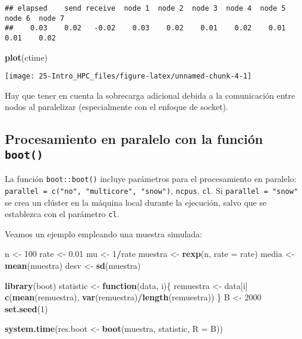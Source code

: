 \documentclass[
]{book}
\newenvironment{Shaded}{\begin{snugshade}}{\end{snugshade}}
\newcommand{\ControlFlowTok}[1]{\textcolor[rgb]{0.13,0.29,0.53}{\textbf{#1}}}
\newcommand{\DataTypeTok}[1]{\textcolor[rgb]{0.13,0.29,0.53}{#1}}
\newcommand{\DecValTok}[1]{\textcolor[rgb]{0.00,0.00,0.81}{#1}}
\newcommand{\FloatTok}[1]{\textcolor[rgb]{0.00,0.00,0.81}{#1}}
\newcommand{\KeywordTok}[1]{\textcolor[rgb]{0.13,0.29,0.53}{\textbf{#1}}}
\newcommand{\NormalTok}[1]{#1}
\newcommand{\OperatorTok}[1]{\textcolor[rgb]{0.81,0.36,0.00}{\textbf{#1}}}
\newcommand{\StringTok}[1]{\textcolor[rgb]{0.31,0.60,0.02}{#1}}
\theoremstyle{definition}
\theoremstyle{definition}
\theoremstyle{definition}
\theoremstyle{remark}
\begin{document}
\begin{verbatim}
## elapsed    send receive  node 1  node 2  node 3  node 4  node 5  node 6  node 7 
##    0.03    0.02   -0.02    0.03    0.02    0.01    0.02    0.01    0.01    0.02
\end{verbatim}

\begin{Shaded}
\begin{Highlighting}[]
\KeywordTok{plot}\NormalTok{(ctime)}
\end{Highlighting}
\end{Shaded}

\begin{center}\texttt{[image: 25-Intro\_HPC\_files/figure-latex/unnamed-chunk-4-1]} \end{center}

Hay que tener en cuenta la sobrecarga adicional debida a la comunicación entre nodos
al paralelizar (especialmente con el enfoque de socket).

\hypertarget{procesamiento-en-paralelo-con-la-funciuxf3n-boot}{%
\subsection{\texorpdfstring{Procesamiento en paralelo con la función \texttt{boot()}}{Procesamiento en paralelo con la función boot()}}\label{procesamiento-en-paralelo-con-la-funciuxf3n-boot}}

La función \texttt{boot::boot()} incluye parámetros para el procesamiento en paralelo:
\texttt{parallel\ =\ c("no",\ "multicore",\ "snow")}, \texttt{ncpus}, \texttt{cl}.
Si \texttt{parallel\ =\ "snow"} se crea un clúster en la máquina local durante la ejecución,
salvo que se establezca con el parámetro \texttt{cl}.

Veamos un ejemplo empleando una muestra simulada:

\begin{Shaded}
\begin{Highlighting}[]
\NormalTok{n <-}\StringTok{ }\DecValTok{100}
\NormalTok{rate <-}\StringTok{ }\FloatTok{0.01}
\NormalTok{mu <-}\StringTok{ }\DecValTok{1}\OperatorTok{/}\NormalTok{rate}
\NormalTok{muestra <-}\StringTok{ }\KeywordTok{rexp}\NormalTok{(n, }\DataTypeTok{rate =}\NormalTok{ rate)}
\NormalTok{media <-}\StringTok{ }\KeywordTok{mean}\NormalTok{(muestra)}
\NormalTok{desv <-}\StringTok{ }\KeywordTok{sd}\NormalTok{(muestra)}

\KeywordTok{library}\NormalTok{(boot)}
\NormalTok{statistic <-}\StringTok{ }\ControlFlowTok{function}\NormalTok{(data, i)\{}
\NormalTok{  remuestra <-}\StringTok{ }\NormalTok{data[i]}
  \KeywordTok{c}\NormalTok{(}\KeywordTok{mean}\NormalTok{(remuestra), }\KeywordTok{var}\NormalTok{(remuestra)}\OperatorTok{/}\KeywordTok{length}\NormalTok{(remuestra))}
\NormalTok{\}}
\NormalTok{B <-}\StringTok{ }\DecValTok{2000}
\KeywordTok{set.seed}\NormalTok{(}\DecValTok{1}\NormalTok{)}

\KeywordTok{system.time}\NormalTok{(res.boot <-}\StringTok{ }\KeywordTok{boot}\NormalTok{(muestra, statistic, }\DataTypeTok{R =}\NormalTok{ B))}
\end{Highlighting}
\end{Shaded}
\end{document}
